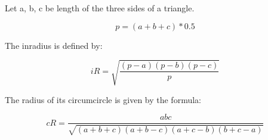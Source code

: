 Let a, b, c be length of the three sides of a triangle.

$$ p = (a + b + c) * 0.5 $$

The inradius is defined by:

$$ iR = \sqrt{\frac{(p - a)(p - b)(p - c)}{p}}$$

The radius of its circumcircle is given by the formula:

$$ cR = \frac{abc}{\sqrt{(a + b + c)(a + b - c)(a + c - b)(b + c - a)}}$$

